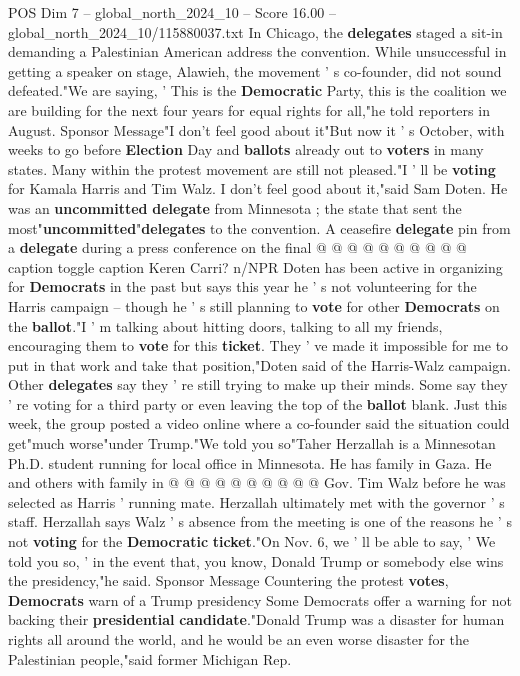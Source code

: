 \begin{textsample}{POS Dim 7 – global\_north\_2024\_10 – Score 16.00 – global\_north\_2024\_10/115880037.txt}
In Chicago, the \textbf{delegates} staged a sit-in demanding a Palestinian American address the convention.
While unsuccessful in getting a speaker on stage, Alawieh, the movement ' s co-founder, did not sound defeated."We are saying, ' This is the \textbf{Democratic} Party, this is the coalition we are building for the next four years for equal rights for all,"he told reporters in August.
Sponsor Message"I don't feel good about it"But now it ' s October, with weeks to go before \textbf{Election} Day and \textbf{ballots} already out to \textbf{voters} in many states.
Many within the protest movement are still not pleased."I ' ll be \textbf{voting} for Kamala Harris and Tim Walz.
I don't feel good about it,"said Sam Doten.
He was an \textbf{uncommitted} \textbf{delegate} from Minnesota ; the state that sent the most"\textbf{uncommitted}"\textbf{delegates} to the convention.
A ceasefire \textbf{delegate} pin from a \textbf{delegate} during a press conference on the final @ @ @ @ @ @ @ @ @ @ caption toggle caption Keren Carri? n/NPR Doten has been active in organizing for \textbf{Democrats} in the past but says this year he ' s not volunteering for the Harris campaign -- though he ' s still planning to \textbf{vote} for other \textbf{Democrats} on the \textbf{ballot}."I ' m talking about hitting doors, talking to all my friends, encouraging them to \textbf{vote} for this \textbf{ticket}.
They ' ve made it impossible for me to put in that work and take that position,"Doten said of the Harris-Walz campaign.
Other \textbf{delegates} say they ' re still trying to make up their minds.
Some say they ' re voting for a third party or even leaving the top of the \textbf{ballot} blank.
Just this week, the group posted a video online where a co-founder said the situation could get"much worse"under Trump."We told you so"Taher Herzallah is a Minnesotan Ph.D. student running for local office in Minnesota.
He has family in Gaza.
He and others with family in @ @ @ @ @ @ @ @ @ @ Gov.
Tim Walz before he was selected as Harris ' running mate.
Herzallah ultimately met with the governor ' s staff.
Herzallah says Walz ' s absence from the meeting is one of the reasons he ' s not \textbf{voting} for the \textbf{Democratic} \textbf{ticket}."On Nov. 6, we ' ll be able to say, ' We told you so, ' in the event that, you know, Donald Trump or somebody else wins the presidency,"he said.
Sponsor Message Countering the protest \textbf{votes}, \textbf{Democrats} warn of a Trump presidency Some Democrats offer a warning for not backing their \textbf{presidential} \textbf{candidate}."Donald Trump was a disaster for human rights all around the world, and he would be an even worse disaster for the Palestinian people,"said former Michigan Rep.

\end{textsample}

